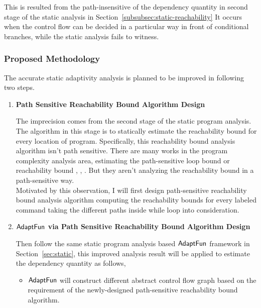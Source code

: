This is resulted from the  path-insensitive of the dependency quantity in
second stage of the static analysis in Section~\ref{subsubsec:static-reachability}
It occurs when the control flow can be decided in a particular way in front of conditional branches, 
while the static analysis fails to witness. 


\subsubsection{Proposed Methodology}
\label{subsubsec:furthers-reachability}
The accurate static adaptivity analysis is planned to be improved in following two steps.
\begin{enumerate}
    \item \textbf{Path Sensitive Reachability Bound Algorithm Design}
    
    The imprecision comes from the second stage of the static program analysis.
    The algorithm in this stage is to statically estimate the 
    reachability bound for every location of program.
    Specifically, this reachability bound analysis algorithm isn't path sensitive. 
    There are many works in the program complexity analysis area, estimating the path-sensitive loop bound 
    or reachability bound
    \cite{GustafssonEL05, HumenbergerJK18}, 
    \cite{BrockschmidtEFFG16,AlbertAGP08,AliasDFG10,Flores-MontoyaH14}, 
    \cite{GulwaniZ10, SinnZV17,GulwaniJK09, GulwaniMC09, abs-2203-04243}. 
    But they aren't analyzing the reachability
    bound in a path-sensitive way.
    \\
    Motivated by this observation, I will first design path-sensitive reachability bound analysis algorithm computing the 
    reachability bounds for every labeled command taking the different paths inside while loop into consideration.
    \item \textbf{$\textsf{AdaptFun}$ via Path Sensitive Reachability Bound Algorithm Design}

    Then follow the same static program analysis based $\textsf{AdaptFun}$ framework in Section~\ref{sec:static},
this improved analysis result will be applied to estimate the dependency quantity as follows,
\begin{itemize}
    \item $\textsf{AdaptFun}$ will construct different abstract control flow graph based on the requirement of the newly-designed
    path-sensitive reachability bound algorithm.


\end{itemize}
\end{enumerate}
